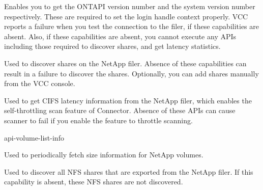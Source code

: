 \documentclass[letterpaper,10pt,english]{sphinxmanual}
\begin{document}


Enables you to get the ONTAPI version number and the system version number respectively. These are required to set the login handle context properly. VCC reports a failure when you test the connection to the filer, if these capabilities are absent. Also, if these capabilities are absent, you cannot execute any APIs including those required to discover shares, and get latency statistics.






Used to discover shares on the NetApp filer. Absence of these capabilities can result in a failure to discover the shares. Optionally, you can add shares manually from the VCC console.






Used to get CIFS latency information from the NetApp filer, which enables the self-throttling scan feature of Connector. Absence of these APIs can cause scanner to fail if you enable the feature to throttle scanning.


api-volume-list-info


Used to periodically fetch size information for NetApp volumes.





Used to discover all NFS shares that are exported from the NetApp filer. If this capability is absent, these NFS shares are not discovered.
\end{document}
